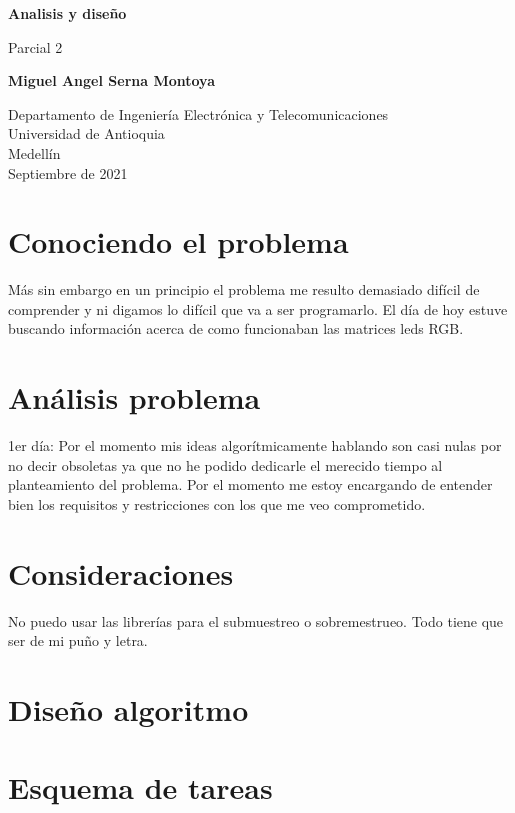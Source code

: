 \documentclass{article}
\begin{document}
\begin{titlepage}
    \begin{center}
        \vspace*{1cm}
            
        \Huge
        \textbf{Analisis y diseño}
            
        \vspace{0.5cm}
        \LARGE
        Parcial 2
            
        \vspace{1.5cm}
        \textbf{Miguel Angel Serna Montoya}
            
        \vfill
            
        \vspace{0.8cm}
            
        \Large
        Departamento de Ingeniería Electrónica y Telecomunicaciones\\
        Universidad de Antioquia\\
        Medellín\\
        Septiembre de 2021
            
    \end{center}
\end{titlepage}

\tableofcontents

\section{Conociendo el problema} 
Más sin embargo en un principio el problema me resulto demasiado difícil de comprender y ni digamos lo difícil que va a ser programarlo. El día de hoy estuve buscando información acerca de como funcionaban las matrices leds RGB. 

\section{Análisis problema} \label{contenido}
1er día: Por el momento mis ideas algorítmicamente hablando son casi nulas por no decir obsoletas ya que no he podido dedicarle el merecido tiempo al planteamiento del problema. Por el momento me estoy encargando de entender bien los requisitos y restricciones con los que me veo comprometido.
\section{Consideraciones}
No puedo usar las librerías para el submuestreo o sobremestrueo. Todo tiene que ser de mi puño y letra.
\section{Diseño algoritmo}
\section{Esquema de tareas}
\end{document}
